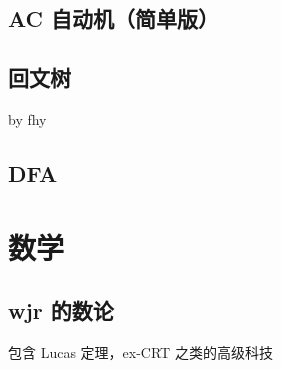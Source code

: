 \documentclass[12pt]{article}
\theoremstyle{definition}
\theoremstyle{remark}
\begin{document}
\subsection{AC 自动机（简单版）}



\newpage

\subsection{回文树}

by fhy



\newpage

\subsection{DFA}



\newpage

{\centering\section{数学}}

\subsection{wjr 的数论}

包含 Lucas 定理，ex-CRT 之类的高级科技



\newpage
\end{document}

